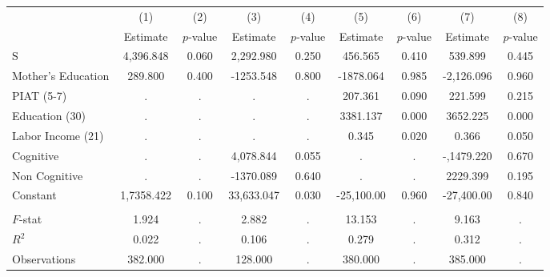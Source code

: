 \begin{tabular}{lcccccccc} \toprule
 & (1) & (2) & (3) & (4) & (5) & (6) & (7) & (8) \\ 
 & Estimate  & $p$-value  & Estimate  & $p$-value  & Estimate  & $p$-value  & Estimate  & $p$-value  \\  \midrule
S &  4,396.848 &     0.060 &  2,292.980 &     0.250 &   456.565 &     0.410 &   539.899 &     0.445 \\  
Mother's Education &   289.800 &     0.400 & -1253.548 &     0.800 & -1878.064 &     0.985 & -2,126.096 &     0.960 \\  
PIAT (5-7) &         . &         . &         . &         . &   207.361 &     0.090 &   221.599 &     0.215 \\  
Education (30) &         . &         . &         . &         . &  3381.137 &     0.000 &  3652.225 &     0.000 \\  
Labor Income (21) &         . &         . &         . &         . &     0.345 &     0.020 &     0.366 &     0.050 \\  
Cognitive &         . &         . &  4,078.844 &     0.055 &         . &         . & -,1479.220 &     0.670 \\  
Non Cognitive &         . &         . & -1370.089 &     0.640 &         . &         . &  2229.399 &     0.195 \\  
Constant & 1,7358.422 &     0.100 & 33,633.047 &     0.030 & -25,100.00 &     0.960 & -27,400.00 &     0.840 \\  \\ \midrule
$F$-stat &     1.924 &         . &     2.882 &         . &    13.153 &         . &     9.163 &         . \\  
$R^2$ &     0.022 &         . &     0.106 &         . &     0.279 &         . &     0.312 &         . \\  
Observations &   382.000 &         . &   128.000 &         . &   380.000 &         . &   385.000 &         . \\  
\bottomrule \end{tabular}
